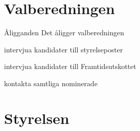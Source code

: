 \documentclass[pdfbookmarks,a4paper,11pt]{article}
\newlength{\itemcollength}
\newenvironment{reglemlista}{%
  \begin{list}{}{%
      \setlength{\labelwidth}{\itemcollength}%
      \setlength{\leftmargin}{\labelwidth + \labelsep}%
      \renewcommand{\makelabel}[1]{%
        \raisebox{0pt}[1ex][0pt]{%
          \makebox[\labelwidth][l]{%
            \parbox[t]{\itemcollength}{%
              \raggedright\hspace{0pt}##1}}}\hfill}%
      }}{%
  \end{list}}
\begin{document}
\section{Valberedningen}

\begin{reglemlista}

	\item[Åligganden]
	Det åligger valberedningen
	\begin{attlista}
		\item intervjua kandidater till styrelseposter
		\item intervjua kandidater till Framtidsutskottet
		\item kontakta samtliga nominerade
	\end{attlista}

\end{reglemlista}

\section{Styrelsen}
\end{document}
